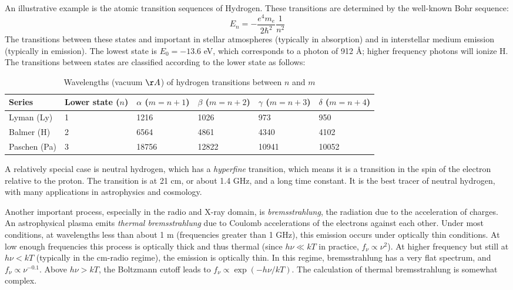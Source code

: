 An illustrative example is the atomic transition sequences of
Hydrogen. These transitions are determined by the well-known Bohr
sequence:
\begin{equation}
E_n = - \frac{e^4m_e}{2\hbar^2} \frac{1}{n^2}
\end{equation}
The transitions between these states and important in stellar
atmospheres (typically in absorption) and in interstellar medium
emission (typically in emission). The lowest state is $E_0 = - 13.6$
eV, which corresponds to a photon of 912 \AA; higher frequency photons
will ionize H. The transitions between states are classified
according to the lower state as follows:

\begin{table}[htp]
\caption{
\label{table:hydrogen} Wavelengths (vacuum $\AA$) of hydrogen transitions between $n$ and $m$}
\begin{tabular}{llllll}
\hline\hline
Series & Lower state ($n$) & $\alpha$ ($m = n+1$) & $\beta$ ($m=n+2$)
& $\gamma$ ($m=n+3$) & $\delta$ ($m=n+4$) \\
\hline
Lyman (Ly) & 1 & 1216 & 1026	& 973	& 950 \\
Balmer (H) & 2 & 6564 & 4861	& 4340	& 4102 \\
Paschen (Pa) & 3 & 18756 & 12822	& 10941	& 10052 \\
\hline
\end{tabular}
\end{table}

A relatively special case is neutral hydrogen, which has a {\it
hyperfine} transition, which means it is a transition in the spin of
the electron relative to the proton. The transition is at 21 cm, or
about 1.4 GHz, and a long time constant. It is the best tracer of
neutral hydrogen, with many applications in astrophysics and
cosmology.

Another important process, especially in the radio and X-ray domain,
is {\it bremsstrahlung}, the radiation due to the acceleration of
charges. An astrophysical plasma emits {\it thermal bremsstrahlung}
due to Coulomb accelerations of the electrons against each
other. Under most conditions, at wavelengths less than about 1 m
(frequencies greater than 1 GHz), this emission occurs under optically
thin conditions. At low enough frequencies this process is optically
thick and thus thermal (since $h\nu \ll kT$ in practice,
$f_\nu\propto \nu^2$). At higher frequency but still at $h\nu < kT$
(typically in the cm-radio regime), the emission is optically thin. In
this regime, bremsstrahlung has a very flat spectrum, and
$f_\nu\propto \nu^{-0.1}$. Above $h\nu> kT$, the Boltzmann cutoff
leads to $f_\nu\propto \exp(-h\nu/kT)$. The calculation of thermal
bremsstrahlung is somewhat complex.

